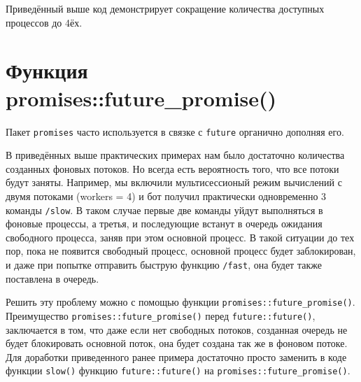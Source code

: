 \documentclass[
]{book}
\begin{document}
Приведённый выше код демонстрирует сокращение количества доступных процессов до 4ёх.

\section{Функция promises::future\_promise()}\label{ux444ux443ux43dux43aux446ux438ux44f-promisesfuture_promise}

Пакет \texttt{promises} часто используется в связке с \texttt{future} органично дополняя его.

В приведённых выше практических примерах нам было достаточно количества созданных фоновых потоков. Но всегда есть вероятность того, что все потоки будут заняты. Например, мы включили мультисессионый режим вычислений с двумя потоками (workers = 4) и бот получил практически одновременно 3 команды \texttt{/slow}. В таком случае первые две команды уйдут выполняться в фоновые процессы, а третья, и последующие встанут в очередь ожидания свободного процесса, заняв при этом основной процесс. В такой ситуации до тех пор, пока не появится свободный процесс, основной процесс будет заблокирован, и даже при попытке отправить быструю функцию \texttt{/fast}, она будет также поставлена в очередь.

Решить эту проблему можно с помощью функции \texttt{promises::future\_promise()}. Преимущество \texttt{promises::future\_promise()} перед \texttt{future::future()}, заключается в том, что даже если нет свободных потоков, созданная очередь не будет блокировать основной поток, она будет создана так же в фоновом потоке. Для доработки приведенного ранее примера достаточно просто заменить в коде функции \texttt{slow()} функцию \texttt{future::future()} на \texttt{promises::future\_promise()}.
\end{document}
